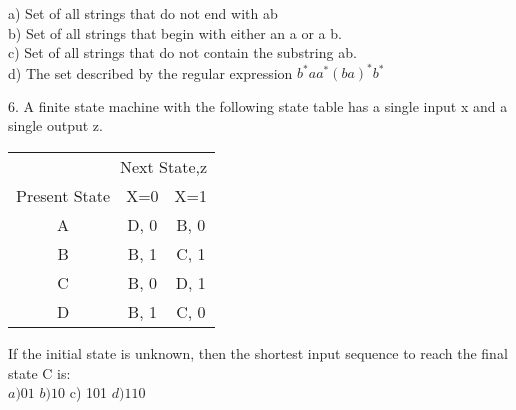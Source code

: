 \documentclass{article}
\begin{document}
\hspace{0.5cm}
a) Set of all strings that do not end with ab\\
\hspace{0.5cm}
b) Set of all strings that begin with either an a or a b.\\
\hspace{0.5cm}
c) Set of all strings that do not contain the substring ab.\\
\hspace{0.5cm}
d) The set described by the regular expression $b^{*}aa^{*}(ba)^{*}b^{*}$ \\

\vspace*{3mm}

\vspace*{0.2cm}
6. A finite state machine with the following state table has a single input x and a single output z.\\

\begin{center}
\begin{tabular}{ccc}
\hline

\hline

\hline

\hline
  \multicolumn{3}{r}{{Next State,z}}\\
 \cline{2-3}
{Present State} & {X=0} & {X=1}\\
\hline
A & D, 0 & B, 0\\
B & B, 1 & C, 1\\
C & B, 0 & D, 1\\
D & B, 1 & C, 0\\
\hline

\hline

\hline

\hline
\end{tabular}
\end{center}

\vspace*{0.2cm}

\vspace*{3mm}
\hspace{0.5cm}
If the initial state is unknown, then the shortest input sequence to reach the final state C is:\\

\vspace*{0.2cm}
\hspace{0.5cm}
$a) 01$  \hspace*{0.5cm}  $b) 10$  \hspace*{0.5cm}   c) 101  \hspace*{0.5cm}  $d) 110$ \\
\vspace*{0.2cm}
\end{document}
